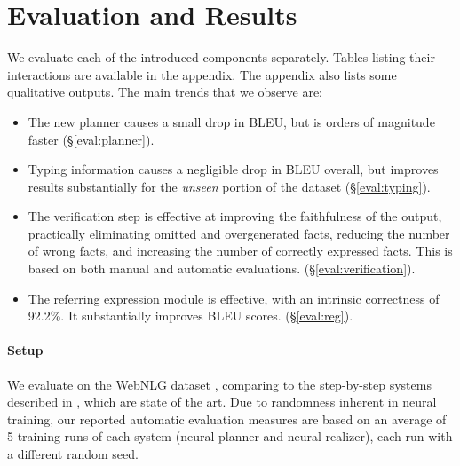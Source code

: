 \documentclass[11pt,a4paper,table,xcdraw]{article}
\begin{document}
% 


\section{Evaluation and Results}
We evaluate each of the introduced components separately. Tables listing their interactions are available in the appendix. The appendix also lists some qualitative outputs.
The main trends that we observe are:
\begin{itemize}
    \item The new planner causes a small drop in BLEU, but is orders of magnitude faster (\S\ref{eval:planner}).
    \item Typing information causes a negligible drop in BLEU overall, but improves results substantially for the \emph{unseen} portion of the dataset (\S\ref{eval:typing}).
    \item The verification step is effective at improving the faithfulness of the output, practically eliminating omitted and overgenerated facts, reducing the number of wrong facts, and increasing the number of correctly expressed facts. This is based on both manual and automatic evaluations. (\S\ref{eval:verification}).
    \item The referring expression module is effective, with an intrinsic correctness of 92.2\%. It substantially improves BLEU scores. (\S\ref{eval:reg}).
\end{itemize}
% 

\paragraph{Setup} We evaluate on the WebNLG dataset \cite{colin2016webnlg}, comparing to the step-by-step systems described in \citet{step-by-step}, which are state of the art. Due to randomness inherent in neural training, our reported automatic evaluation measures are based on an average of 5 training runs of each system (neural planner and neural realizer), each run with a different random seed. 

\end{document}
